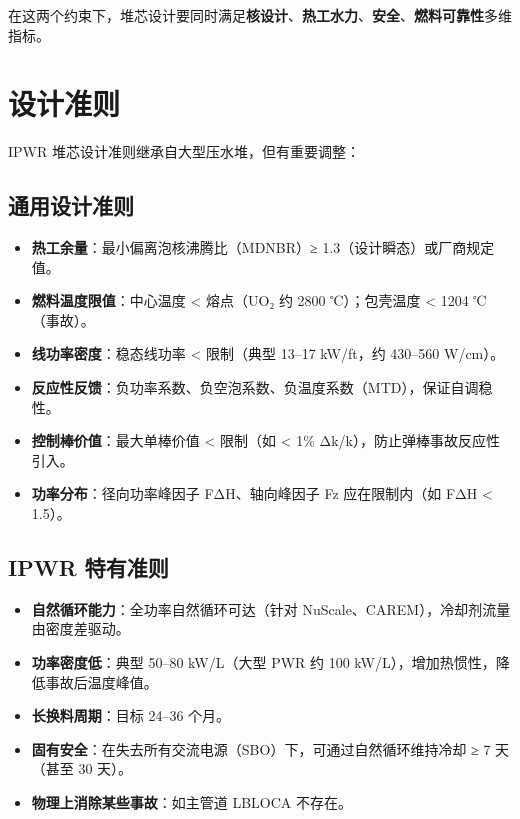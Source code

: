 \documentclass[
  UTF8,
  scheme=plain,
  fontsize=10pt,
  openany
]{ctexbook}
\begin{document}
在这两个约束下，堆芯设计要同时满足\textbf{核设计}、\textbf{热工水力}、\textbf{安全}、\textbf{燃料可靠性}多维指标。

\section{设计准则}\label{ux8bbeux8ba1ux51c6ux5219}

IPWR 堆芯设计准则继承自大型压水堆，但有重要调整：

\subsection{通用设计准则}\label{ux901aux7528ux8bbeux8ba1ux51c6ux5219}

\begin{itemize}
\tightlist
\item
  \textbf{热工余量}：最小偏离泡核沸腾比（MDNBR）≥
  1.3（设计瞬态）或厂商规定值。
\item
  \textbf{燃料温度限值}：中心温度 \textless{} 熔点（UO₂ 约 2800
  ℃）；包壳温度 \textless{} 1204 ℃（事故）。
\item
  \textbf{线功率密度}：稳态线功率 \textless{} 限制（典型 13--17
  kW/ft，约 430--560 W/cm）。
\item
  \textbf{反应性反馈}：负功率系数、负空泡系数、负温度系数（MTD），保证自调稳性。
\item
  \textbf{控制棒价值}：最大单棒价值 \textless{} 限制（如 \textless{} 1\%
  Δk/k），防止弹棒事故反应性引入。
\item
  \textbf{功率分布}：径向功率峰因子 FΔH、轴向峰因子 Fz 应在限制内（如
  FΔH \textless{} 1.5）。
\end{itemize}

\subsection{IPWR 特有准则}\label{ipwr-ux7279ux6709ux51c6ux5219}

\begin{itemize}
\tightlist
\item
  \textbf{自然循环能力}：全功率自然循环可达（针对
  NuScale、CAREM），冷却剂流量由密度差驱动。
\item
  \textbf{功率密度低}：典型 50--80 kW/L（大型 PWR 约 100
  kW/L），增加热惯性，降低事故后温度峰值。
\item
  \textbf{长换料周期}：目标 24--36 个月。
\item
  \textbf{固有安全}：在失去所有交流电源（SBO）下，可通过自然循环维持冷却
  ≥ 7 天（甚至 30 天）。
\item
  \textbf{物理上消除某些事故}：如主管道 LBLOCA 不存在。
\end{itemize}
\end{document}

